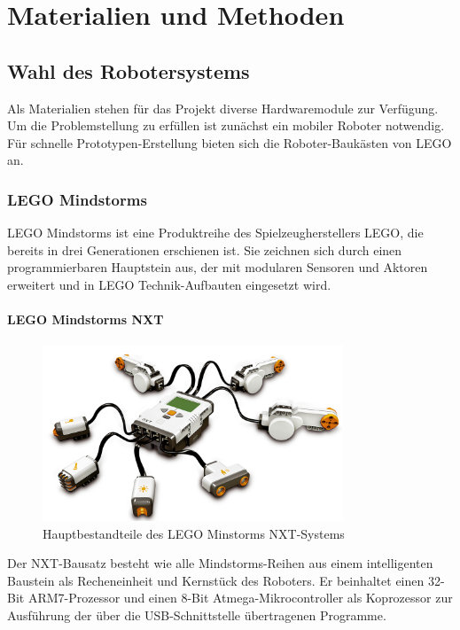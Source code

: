 \chapter{Materialien und Methoden}
\label{cha:Materials}

\section{Wahl des Robotersystems}

Als Materialien stehen für das Projekt diverse Hardwaremodule zur Verfügung. Um die Problemstellung zu erfüllen ist zunächst ein mobiler Roboter notwendig. Für schnelle Prototypen-Erstellung bieten sich die Roboter-Baukästen von LEGO an.

\subsection{LEGO Mindstorms}

LEGO Mindstorms ist eine Produktreihe des Spielzeugherstellers LEGO, die bereits in drei Generationen erschienen ist. Sie zeichnen sich durch einen programmierbaren Hauptstein aus, der mit modularen Sensoren und Aktoren erweitert und in LEGO Technik-Aufbauten eingesetzt wird.

\subsubsection{LEGO Mindstorms NXT}

\begin{figure}[h]
\centering
\includegraphics[width=0.8\textwidth]{Bilder/MatsAndMets/nxt}
\caption{Hauptbestandteile des LEGO Minstorms NXT-Systems}
\label{fig:nxt}
\end{figure}

Der NXT-Bausatz besteht wie alle Mindstorms-Reihen aus einem intelligenten Baustein als Recheneinheit und Kernstück des Roboters. Er beinhaltet einen 32-Bit ARM7-Prozessor und einen 8-Bit Atmega-Mikrocontroller als Koprozessor zur Ausführung der über die USB-Schnittstelle übertragenen Programme.

